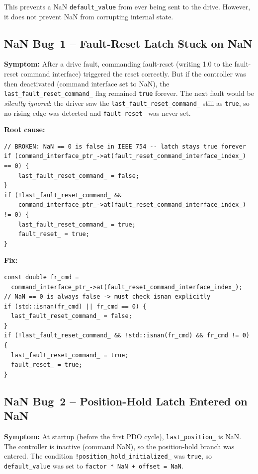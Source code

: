 \documentclass[11pt,a4paper]{article}
\begin{document}
This prevents a NaN \texttt{default\_value} from ever being sent to the
drive.  However, it does not prevent NaN from corrupting internal state.

\subsection{NaN Bug~1 -- Fault-Reset Latch Stuck on NaN}
\label{sec:nan1}

\textbf{Symptom:} After a drive fault, commanding fault-reset (writing 1.0
to the fault-reset command interface) triggered the reset correctly.  But if
the controller was then deactivated (command interface set to NaN), the
\texttt{last\_fault\_reset\_command\_} flag remained \texttt{true} forever.
The next fault would be \emph{silently ignored}: the driver saw the
\texttt{last\_fault\_reset\_command\_} still as \texttt{true}, so no rising
edge was detected and \texttt{fault\_reset\_} was never set.

\textbf{Root cause:}
\begin{lstlisting}[caption={NaN Bug~1: original (broken) fault-reset logic}]
// BROKEN: NaN == 0 is false in IEEE 754 -- latch stays true forever
if (command_interface_ptr_->at(fault_reset_command_interface_index_) == 0) {
    last_fault_reset_command_ = false;
}
if (!last_fault_reset_command_ &&
    command_interface_ptr_->at(fault_reset_command_interface_index_) != 0) {
    last_fault_reset_command_ = true;
    fault_reset_ = true;
}
\end{lstlisting}

\textbf{Fix:}
\begin{lstlisting}[caption={NaN Bug~1: corrected fault-reset logic}]
const double fr_cmd =
  command_interface_ptr_->at(fault_reset_command_interface_index_);
// NaN == 0 is always false -> must check isnan explicitly
if (std::isnan(fr_cmd) || fr_cmd == 0) {
  last_fault_reset_command_ = false;
}
if (!last_fault_reset_command_ && !std::isnan(fr_cmd) && fr_cmd != 0) {
  last_fault_reset_command_ = true;
  fault_reset_ = true;
}
\end{lstlisting}

\subsection{NaN Bug~2 -- Position-Hold Latch Entered on NaN}
\label{sec:nan2}

\textbf{Symptom:} At startup (before the first PDO cycle),
\texttt{last\_position\_} is NaN.  The controller is inactive (command NaN),
so the position-hold branch was entered.  The condition
\texttt{!position\_hold\_initialized\_} was \texttt{true}, so
\texttt{default\_value} was set to \texttt{factor * NaN + offset = NaN}.
\end{document}
